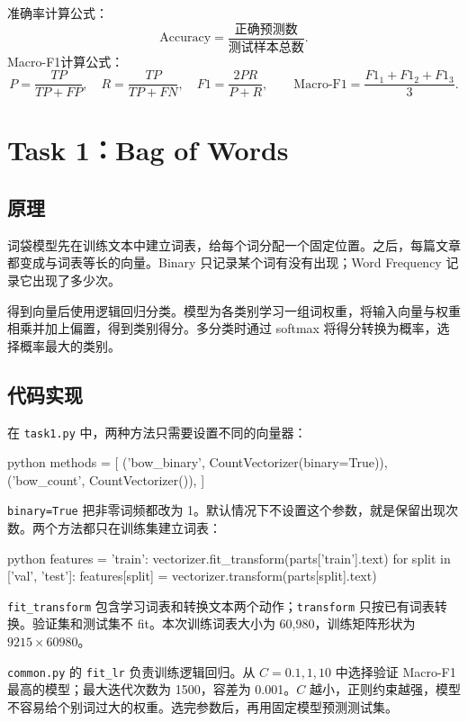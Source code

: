 \documentclass[12pt, a4paper, fontset=fandol]{ctexart}
\begin{document}
准确率计算公式：
\begin{equation}
\mathrm{Accuracy}=\frac{\text{正确预测数}}{\text{测试样本总数}}.
\end{equation}
Macro-F1计算公式：
\begin{equation}
P=\frac{TP}{TP+FP},\quad R=\frac{TP}{TP+FN},\quad
F1=\frac{2PR}{P+R},\qquad \mathrm{Macro\mbox{-}F1}=\frac{F1_1+F1_2+F1_3}{3}.
\end{equation}

\section{Task 1：Bag of Words}
\subsection{原理}
词袋模型先在训练文本中建立词表，给每个词分配一个固定位置。之后，每篇文章都变成与词表等长的向量。Binary 只记录某个词有没有出现；Word Frequency 记录它出现了多少次。

得到向量后使用逻辑回归分类。模型为各类别学习一组词权重，将输入向量与权重相乘并加上偏置，得到类别得分。多分类时通过 softmax 将得分转换为概率，选择概率最大的类别。

\subsection{代码实现}
在 \texttt{task1.py} 中，两种方法只需要设置不同的向量器：
\begin{mycode}{python}
methods = [
    ('bow_binary', CountVectorizer(binary=True)),
    ('bow_count', CountVectorizer()),
]
\end{mycode}
\texttt{binary=True} 把非零词频都改为 1。默认情况下不设置这个参数，就是保留出现次数。两个方法都只在训练集建立词表：
\begin{mycode}{python}
features = {'train': vectorizer.fit_transform(parts['train'].text)}
for split in ['val', 'test']:
    features[split] = vectorizer.transform(parts[split].text)
\end{mycode}
\texttt{fit\_transform} 包含学习词表和转换文本两个动作；\texttt{transform} 只按已有词表转换。验证集和测试集不 fit。本次训练词表大小为 60,980，训练矩阵形状为 $9215\times60980$。

\texttt{common.py} 的 \texttt{fit\_lr} 负责训练逻辑回归。从 $C=0.1,1,10$ 中选择验证 Macro-F1 最高的模型；最大迭代次数为 1500，容差为 0.001。$C$ 越小，正则约束越强，模型不容易给个别词过大的权重。选完参数后，再用固定模型预测测试集。
\end{document}
